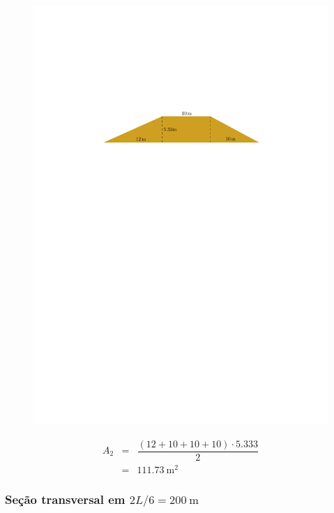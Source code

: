 \documentclass[a4paper, 12pt, brazilian]{article}
\begin{document}
	\begin{figure}[H]
		\centering
		\includegraphics[width=0.9\linewidth]{images/lpersix}
		\label{fig:lpersix}
	\end{figure}
	
	
	\begin{eqnarray}
		A_{2}&=&\dfrac{(12+10+10+10)\cdot 5.333}{2}\\
		&=&\SI{111.73}{\meter^{2}}
	\end{eqnarray}
	
	\subsubsection{Seção transversal em $2L/6=\SI{200}{\meter}$}
	
\end{document}

